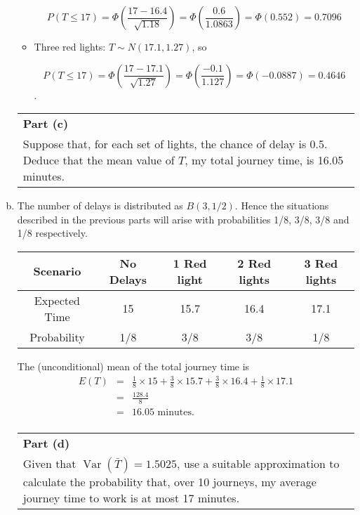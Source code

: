 \documentclass[a4paper,12pt]{article}
\begin{document}
\begin{enumerate}[(a)]
\begin{itemize}
\[P(T \leq 17) = \Phi \left(\frac{17 - 16.4}{\sqrt{1.18}} \right) = \Phi \left(\frac{0.6}{1.0863}\right) = \Phi(0.552) = 0.7096\]

\item Three red lights: $T \sim N(17.1, 1.27)$, so

\[P(T \leq 17) = \Phi \left(\frac{17 - 17.1}{\sqrt{1.27}} \right) = \Phi \left( \frac{-0.1}{1.127}\right) = \Phi(-0.0887) = 0.4646\]
.
\end{itemize}

\newpage


\begin{table}[ht!]
 \centering
 \begin{tabular}{|p{15cm}|}
 \hline  \large  
\noindent \textbf{Part (c)}\\ \large  Suppose that, for each set of lights, the chance of delay is 0.5. Deduce that the mean value of 
$T$, my total journey time, is 16.05 minutes.


\\ \hline
  \end{tabular}
\end{table}
 \item The number of delays is distributed as $B(3, 1/2)$. Hence the situations described in the previous parts will arise with probabilities 1/8, 3/8, 3/8 and 1/8 respectively.
 
\begin{center} 
\begin{tabular}{|c|c|c|c|c|} \hline
Scenario  & No Delays & 1 Red light & 2 Red lights  & 3 Red lights  \\ \hline
Expected Time & 15 & 15.7 & 16.4 & 17.1 \\ \hline 
Probability &  1/8 & 3/8 & 3/8 & 1/8  \\ \hline
\end{tabular}
\end{center}

The (unconditional) mean of the total journey time is
\begin{eqnarray*}
E(T) &=& \frac{1}{8} \times 15 + \frac{3}{8} \times 15.7 + \frac{3}{8} \times 16.4  + \frac{1}{8} \times 17.1\\
&=& \frac{128.4}{8} \\
&=& 16.05 \mbox{ minutes.}\\
\end{eqnarray*}
\newpage
\begin{table}[ht!]
 \centering
 \begin{tabular}{|p{15cm}|}
 \hline  \large  
\noindent \textbf{Part (d)}\\ \large Given that $\operatorname{Var}(\bar{T}) = 1.5025$, use a suitable approximation to calculate the probability that, over 10 journeys, my average journey time to work is at most 17 minutes.
\\ \hline
  \end{tabular}
\end{table}



\end{enumerate}
\end{document}
